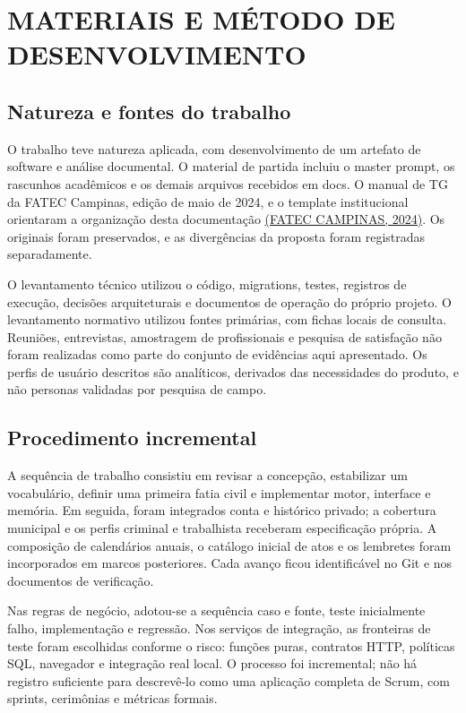 \chapter{MATERIAIS E MÉTODO DE DESENVOLVIMENTO}
\label{chapter-3}
\section{Natureza e fontes do trabalho}
\label{section-3-1}
O trabalho teve natureza aplicada, com desenvolvimento de um artefato de software e análise documental. O material de partida incluiu o master prompt, os rascunhos acadêmicos e os demais arquivos recebidos em docs. O manual de TG da FATEC Campinas, edição de maio de 2024, e o template institucional orientaram a organização desta documentação \hyperref[ref:FATECMANUAL]{(FATEC CAMPINAS, 2024)}. Os originais foram preservados, e as divergências da proposta foram registradas separadamente.

O levantamento técnico utilizou o código, migrations, testes, registros de execução, decisões arquiteturais e documentos de operação do próprio projeto. O levantamento normativo utilizou fontes primárias, com fichas locais de consulta. Reuniões, entrevistas, amostragem de profissionais e pesquisa de satisfação não foram realizadas como parte do conjunto de evidências aqui apresentado. Os perfis de usuário descritos são analíticos, derivados das necessidades do produto, e não personas validadas por pesquisa de campo.

\section{Procedimento incremental}
\label{section-3-2}
A sequência de trabalho consistiu em revisar a concepção, estabilizar um vocabulário, definir uma primeira fatia civil e implementar motor, interface e memória. Em seguida, foram integrados conta e histórico privado; a cobertura municipal e os perfis criminal e trabalhista receberam especificação própria. A composição de calendários anuais, o catálogo inicial de atos e os lembretes foram incorporados em marcos posteriores. Cada avanço ficou identificável no Git e nos documentos de verificação.

Nas regras de negócio, adotou-se a sequência caso e fonte, teste inicialmente falho, implementação e regressão. Nos serviços de integração, as fronteiras de teste foram escolhidas conforme o risco: funções puras, contratos HTTP, políticas SQL, navegador e integração real local. O processo foi incremental; não há registro suficiente para descrevê-lo como uma aplicação completa de Scrum, com sprints, cerimônias e métricas formais.

